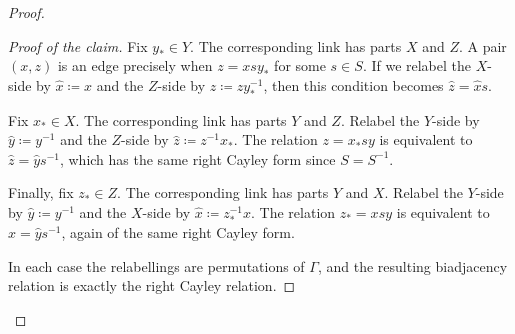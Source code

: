 \documentclass[10pt,a4paper]{amsart}
\begin{document}
\begin{proof}
\begin{proof}[Proof of the claim]
Fix $y_\ast\in Y$. The corresponding link has parts $X$ and $Z$. A pair $(x,z)$ is an edge precisely when $z=xsy_\ast$ for some $s\in S$. If we relabel the $X$-side by $\hat{x}\coloneqq x$ and the $Z$-side by $\hat{z}\coloneqq zy_\ast^{-1}$, then this condition becomes $\hat{z}=\hat{x}s$.

Fix $x_\ast\in X$. The corresponding link has parts $Y$ and $Z$. Relabel the $Y$-side by $\hat{y}\coloneqq y^{-1}$ and the $Z$-side by $\hat{z}\coloneqq z^{-1}x_\ast$. The relation $z=x_\ast sy$ is equivalent to $\hat{z}=\hat{y}s^{-1}$, which has the same right Cayley form since $S=S^{-1}$.

Finally, fix $z_\ast\in Z$. The corresponding link has parts $Y$ and $X$. Relabel the $Y$-side by $\hat{y}\coloneqq y^{-1}$ and the $X$-side by $\hat{x}\coloneqq z_\ast^{-1}x$. The relation $z_\ast=xsy$ is equivalent to $\hat{x}=\hat{y}s^{-1}$, again of the same right Cayley form. 

In each case the relabellings are permutations of $\Gamma$, and the resulting biadjacency relation is exactly the right Cayley relation.
\end{proof}


\end{proof}
\end{document}
